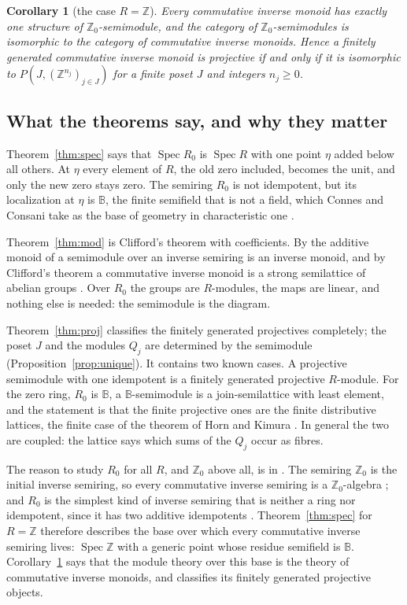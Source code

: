 \documentclass[11pt]{amsart}
\newtheorem{maincor}[theorem]{Corollary}
\theoremstyle{remark}
\newcommand{\B}{\mathbb B}
\DeclareMathOperator{\Spec}{Spec}
\begin{document}
\begin{maincor}[the case $R=\mathbb Z$]\label{cor:Z}
Every commutative inverse monoid has exactly one structure of $\mathbb Z_0$-semimodule, and the category of $\mathbb Z_0$-semimodules is isomorphic to the category of commutative inverse monoids. Hence a finitely generated commutative inverse monoid is projective if and only if it is isomorphic to $P(J,(\mathbb Z^{n_j})_{j\in J})$ for a finite poset $J$ and integers $n_j\ge0$.
\end{maincor}

\subsection{What the theorems say, and why they matter}
Theorem~\ref{thm:spec} says that $\Spec R_0$ is $\Spec R$ with one point $\eta$ added below all others. At $\eta$ every element of $R$, the old zero included, becomes the unit, and only the new zero stays zero. The semiring $R_0$ is not idempotent, but its localization at $\eta$ is $\B$, the finite semifield that is not a field, which Connes and Consani take as the base of geometry in characteristic one \cite{CCs,CC}.

Theorem~\ref{thm:mod} is Clifford's theorem with coefficients. By \cite[Proposition 6.1]{FGJM} the additive monoid of a semimodule over an inverse semiring is an inverse monoid, and by Clifford's theorem a commutative inverse monoid is a strong semilattice of abelian groups \cite{Clifford}. Over $R_0$ the groups are $R$-modules, the maps are linear, and nothing else is needed: the semimodule is the diagram.

Theorem~\ref{thm:proj} classifies the finitely generated projectives completely; the poset $J$ and the modules $Q_j$ are determined by the semimodule (Proposition~\ref{prop:unique}). It contains two known cases. A projective semimodule with one idempotent is a finitely generated projective $R$-module. For the zero ring, $R_0$ is $\B$, a $\B$-semimodule is a join-semilattice with least element, and the statement is that the finite projective ones are the finite distributive lattices, the finite case of the theorem of Horn and Kimura \cite{HK}. In general the two are coupled: the lattice says which sums of the $Q_j$ occur as fibres.

The reason to study $R_0$ for all $R$, and $\mathbb Z_0$ above all, is in \cite{FGJM}. The semiring $\mathbb Z_0$ is the initial inverse semiring, so every commutative inverse semiring is a $\mathbb Z_0$-algebra \cite[Proposition 5.1]{FGJM}; and $R_0$ is the simplest kind of inverse semiring that is neither a ring nor idempotent, since it has two additive idempotents \cite[Corollary 4.12]{FGJM}. Theorem~\ref{thm:spec} for $R=\mathbb Z$ therefore describes the base over which every commutative inverse semiring lives: $\Spec\mathbb Z$ with a generic point whose residue semifield is $\B$. Corollary~\ref{cor:Z} says that the module theory over this base is the theory of commutative inverse monoids, and classifies its finitely generated projective objects.
\end{document}
